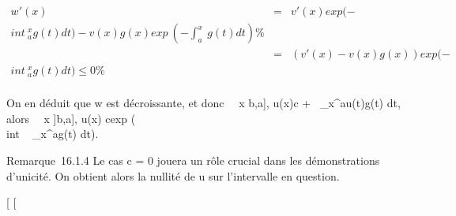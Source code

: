 \documentclass[]{article}
\begin{document}
\begin{align*} w'(x)& =&
v'(x)exp (-\\int ~
_a^xg(t) dt) - v(x)g(x)exp~
(-\int  _a^x~g(t) dt)\%&
\\ & =& (v'(x) -
v(x)g(x))exp (-\\int ~
_a^xg(t) dt) \leq 0 \%& \\
\end{align*}

On en déduit que w est décroissante, et donc
\forall~~x \in [a,b[, w(x) \leq w(a). Mais w(a) = v(a)
= c. On a donc, pour x \in [a,b[, u(x)\leq v(x) \leq
cexp (\\int ~
_a^xg(t) dt), ce qu'on voulait démontrer.

Remarque~16.1.3 De la même fa\ccon on montre que si
\forall~~x \in]b,a], u(x)\leq c
+\int ~
_x^au(t)g(t) dt, alors
\forall~~x \in]b,a], u(x)\leq
cexp (\\int ~
_x^ag(t) dt).

Remarque~16.1.4 Le cas c = 0 jouera un rôle crucial dans les
démonstrations d'unicité. On obtient alors la nullité de u sur
l'intervalle en question.

[
[
\end{document}
